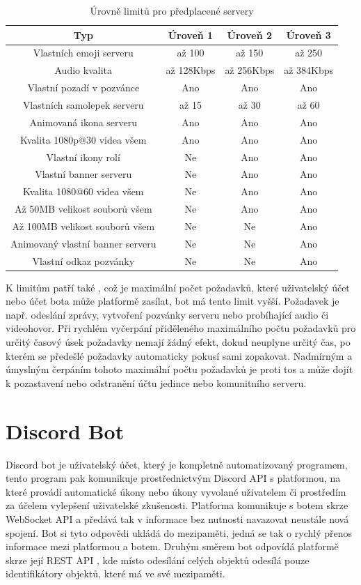 \documentclass[
  program=inf,
biblatex=false,
sourcecodes=true,
joinlists=true,
  figures=true,
  tables=true,
  glossaries=true,
  index=false
]{kidiplom}
\begin{document}
\begin{table}[h]
  \centering
    \begin{tabular}{|c|c|c|c|}
      \hline
      Typ & Úroveň 1 & Úroveň 2 & Úroveň 3 \\
      \hline
      Vlastních emoji serveru & až 100 & až 150 & až 250 \\
      Audio kvalita & až 128Kbps & až 256Kbps & až 384Kbps \\
      Vlastní pozadí v pozvánce & Ano & Ano & Ano \\
      Vlastních samolepek serveru & až 15 & až 30 & až 60 \\
      Animovaná ikona serveru & Ano & Ano & Ano \\
      Kvalita 1080p@30 videa všem & Ano & Ano & Ano \\
      Vlastní ikony rolí & Ne & Ano & Ano \\
      Vlastní banner serveru & Ne & Ano & Ano \\
      Kvalita 1080@60 videa všem & Ne & Ano & Ano \\
      Až 50MB velikost souborů všem & Ne & Ano & Ano \\
      Až 100MB velikost souborů všem & Ne & Ne & Ano \\
      Animovaný vlastní banner serveru & Ne & Ne & Ano \\
      Vlastní odkaz pozvánky & Ne & Ne & Ano \\
      \hline
    \end{tabular}
  \caption{\label{paid_server}Úrovně limitů pro předplacené servery}
\end{table}

K limitům patří také , což je maximální počet 
požadavků, které uživatelský účet nebo účet bota může platformě zasílat, bot
má tento limit vyšší. Požadavek je např. odeslání zprávy, vytvoření
pozvánky serveru nebo probíhající audio či videohovor. Při rychlém vyčerpání
přiděleného maximálního počtu požadavků pro určitý časový úsek požadavky nemají 
žádný efekt, dokud neuplyne určitý čas, po kterém se předešlé požadavky automaticky
pokusí sami zopakovat. Nadmírným a úmyslným čerpáním tohoto maximální počtu požadavků
je proti \acrshort{tos} a může dojít k pozastavení nebo odstranění účtu jedince nebo 
komunitního serveru.

\section{Discord Bot}
Discord bot je uživatelský účet, který je kompletně automatizovaný programem, tento
program pak komunikuje prostřednictvým Discord API \cite{discordapi} s platformou, na které provádí
automatické úkony nebo úkony vyvolané uživatelem či prostředím za účelem
vylepšení uživatelské zkušenosti. Platforma komunikuje
s botem skrze WebSocket API \cite{webapi} a předává tak v  informace bez nutnosti
navazovat neustále nová spojení. Bot si tyto odpovědi ukládá do mezipaměti, 
jedná se tak o rychlý přenos informace mezi platformou a botem.
Druhým směrem bot odpovídá platformě skrze její REST API \cite{restapi}, kde
místo odesílání celých objektů odesílá pouze identifikátory objektů, které má ve své mezipaměti.
\end{document}

